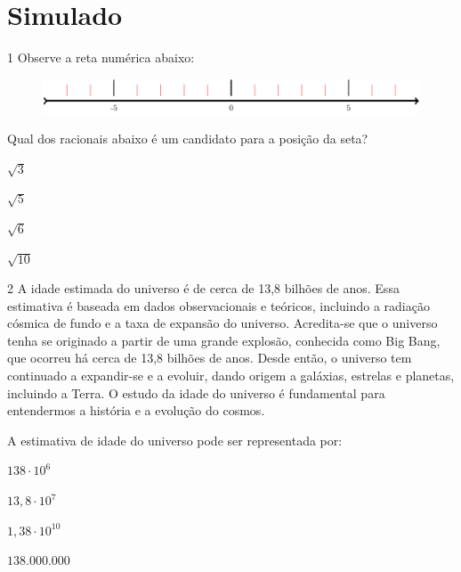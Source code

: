 \chapter[Simulado 2]{Simulado}

\num{1} Observe a reta numérica abaixo:

\begin{figure}[htpb!]
\centering
\includegraphics[width=\textwidth]{./tikz/002.pdf}
\end{figure}

Qual dos racionais abaixo é um candidato para a posição da seta?


\begin{escolha}

  \item $\sqrt{3}$

  \item $\sqrt{5}$

  \item $\sqrt{6}$

  \item $\sqrt{10}$


\end{escolha}


\num{2} A idade estimada do universo é de cerca de 13,8 bilhões de anos. Essa
estimativa é baseada em dados observacionais e teóricos, incluindo a
radiação cósmica de fundo e a taxa de expansão do universo.
Acredita-se que o universo tenha se originado a partir de uma grande
explosão, conhecida como Big Bang, que ocorreu há cerca de 13,8
bilhões de anos. Desde então, o universo tem continuado a expandir-se
e a evoluir, dando origem a galáxias, estrelas e planetas, incluindo a
Terra. O estudo da idade do universo é fundamental para entendermos a
história e a evolução do cosmos.

A estimativa de idade do universo pode ser representada por:

\begin{escolha}

\item $138 \cdot 10^{6}$

\item $13,8 \cdot 10^{7}$

\item $1,38 \cdot 10^{10}$

\item $138.000.000$

\end{escolha}


